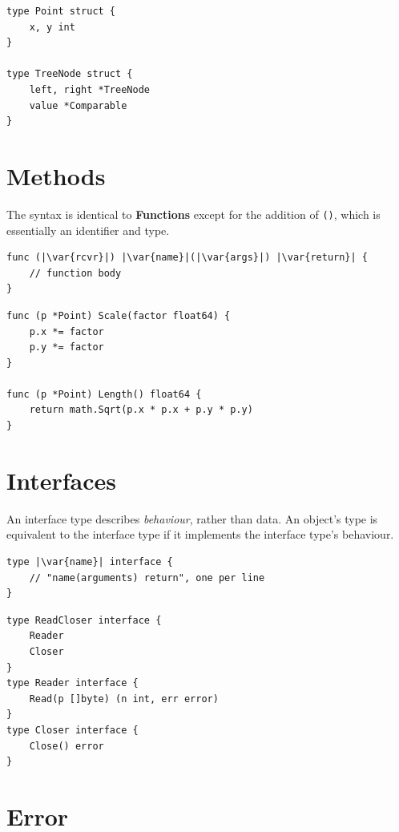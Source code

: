\documentclass{article}
\newcommand{\var}[1]{\texttt{\textit{\underbar{#1}}}}
\begin{document}
\begin{multicols*}{3}
  \vspace{\baselineskip}
\begin{lstlisting}[frame=single]
type Point struct {
    x, y int
}

type TreeNode struct {
    left, right *TreeNode
    value *Comparable
}
\end{lstlisting}

  \filbreak
  \section*{Methods}

  The syntax is identical to {\color{macewan}\bfseries{}Functions} except for the addition of \texttt{(\var{rcvr})}, which is essentially an identifier and type.

\begin{lstlisting}[escapechar=|]
func (|\var{rcvr}|) |\var{name}|(|\var{args}|) |\var{return}| {
    // function body
}
\end{lstlisting}

\begin{lstlisting}[frame=single,escapechar=|]
func (p *Point) Scale(factor float64) {
    p.x *= factor
    p.y *= factor
}

func (p *Point) Length() float64 {
    return math.Sqrt(p.x * p.x + p.y * p.y)
}
\end{lstlisting}

  \filbreak
  \section*{Interfaces}

  An interface type describes \textit{behaviour}, rather than data.
  An object's type is equivalent to the interface type if it implements the interface type's behaviour.

\begin{lstlisting}[escapechar=|]
type |\var{name}| interface {
    // "name(arguments) return", one per line
}
\end{lstlisting}

\begin{lstlisting}[escapechar=|]
type ReadCloser interface {
    Reader
    Closer
}
type Reader interface {
    Read(p []byte) (n int, err error)
}
type Closer interface {
    Close() error
}
\end{lstlisting}

  \filbreak
  \section*{Error}


\end{multicols*}
\end{document}
